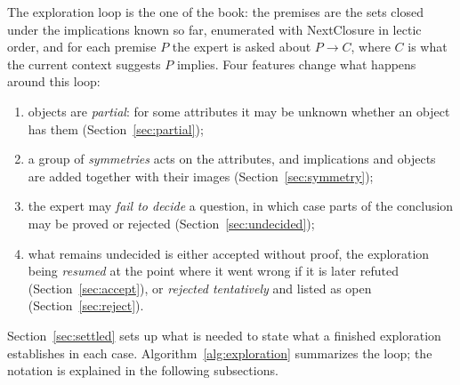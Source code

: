 \documentclass[11pt,a4paper]{article}
\theoremstyle{definition}
\theoremstyle{remark}
\begin{document}
The exploration loop is the one of the book: the premises are the sets closed under the implications known so far, enumerated with NextClosure in lectic order, and for each premise $P$ the expert is asked about $P \to C$, where $C$ is what the current context suggests $P$ implies. Four features change what happens around this loop:
\begin{enumerate}
  \item objects are \emph{partial}: for some attributes it may be unknown whether an object has them (Section~\ref{sec:partial});
  \item a group of \emph{symmetries} acts on the attributes, and implications and objects are added together with their images (Section~\ref{sec:symmetry});
  \item the expert may \emph{fail to decide} a question, in which case parts of the conclusion may be proved or rejected (Section~\ref{sec:undecided});
  \item what remains undecided is either accepted without proof, the exploration being \emph{resumed} at the point where it went wrong if it is later refuted (Section~\ref{sec:accept}), or \emph{rejected tentatively} and listed as open (Section~\ref{sec:reject}).
\end{enumerate}
Section~\ref{sec:settled} sets up what is needed to state what a finished exploration establishes in each case.
Algorithm~\ref{alg:exploration} summarizes the loop; the notation is explained in the following subsections.
\end{document}
